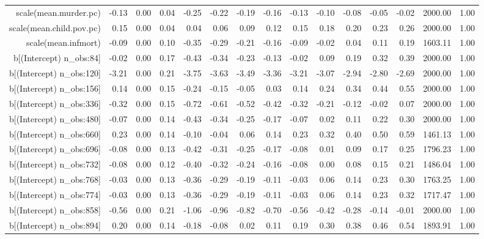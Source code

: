 \begin{table}[ht]
\begin{tabular}{rrrrrrrrrrrrrrr}
  scale(mean.murder.pc) & -0.13 & 0.00 & 0.04 & -0.25 & -0.22 & -0.19 & -0.16 & -0.13 & -0.10 & -0.08 & -0.05 & -0.02 & 2000.00 & 1.00 \\ 
  scale(mean.child.pov.pc) & 0.15 & 0.00 & 0.04 & 0.04 & 0.06 & 0.09 & 0.12 & 0.15 & 0.18 & 0.20 & 0.23 & 0.26 & 2000.00 & 1.00 \\ 
  scale(mean.infmort) & -0.09 & 0.00 & 0.10 & -0.35 & -0.29 & -0.21 & -0.16 & -0.09 & -0.02 & 0.04 & 0.11 & 0.19 & 1603.11 & 1.00 \\ 
  b[(Intercept) n\_obs:84] & -0.02 & 0.00 & 0.17 & -0.43 & -0.34 & -0.23 & -0.13 & -0.02 & 0.09 & 0.19 & 0.32 & 0.39 & 2000.00 & 1.00 \\ 
  b[(Intercept) n\_obs:120] & -3.21 & 0.00 & 0.21 & -3.75 & -3.63 & -3.49 & -3.36 & -3.21 & -3.07 & -2.94 & -2.80 & -2.69 & 2000.00 & 1.00 \\ 
  b[(Intercept) n\_obs:156] & 0.14 & 0.00 & 0.15 & -0.24 & -0.15 & -0.05 & 0.03 & 0.14 & 0.24 & 0.34 & 0.44 & 0.55 & 2000.00 & 1.00 \\ 
  b[(Intercept) n\_obs:336] & -0.32 & 0.00 & 0.15 & -0.72 & -0.61 & -0.52 & -0.42 & -0.32 & -0.21 & -0.12 & -0.02 & 0.07 & 2000.00 & 1.00 \\ 
  b[(Intercept) n\_obs:480] & -0.07 & 0.00 & 0.14 & -0.43 & -0.34 & -0.25 & -0.17 & -0.07 & 0.02 & 0.11 & 0.22 & 0.30 & 2000.00 & 1.00 \\ 
  b[(Intercept) n\_obs:660] & 0.23 & 0.00 & 0.14 & -0.10 & -0.04 & 0.06 & 0.14 & 0.23 & 0.32 & 0.40 & 0.50 & 0.59 & 1461.13 & 1.00 \\ 
  b[(Intercept) n\_obs:696] & -0.08 & 0.00 & 0.13 & -0.42 & -0.31 & -0.25 & -0.17 & -0.08 & 0.01 & 0.09 & 0.17 & 0.25 & 1796.23 & 1.00 \\ 
  b[(Intercept) n\_obs:732] & -0.08 & 0.00 & 0.12 & -0.40 & -0.32 & -0.24 & -0.16 & -0.08 & 0.00 & 0.08 & 0.15 & 0.21 & 1486.04 & 1.00 \\ 
  b[(Intercept) n\_obs:768] & -0.03 & 0.00 & 0.13 & -0.36 & -0.29 & -0.19 & -0.11 & -0.03 & 0.06 & 0.14 & 0.23 & 0.30 & 1763.25 & 1.00 \\ 
  b[(Intercept) n\_obs:774] & -0.03 & 0.00 & 0.13 & -0.36 & -0.29 & -0.19 & -0.11 & -0.03 & 0.06 & 0.14 & 0.23 & 0.32 & 1717.47 & 1.00 \\ 
  b[(Intercept) n\_obs:858] & -0.56 & 0.00 & 0.21 & -1.06 & -0.96 & -0.82 & -0.70 & -0.56 & -0.42 & -0.28 & -0.14 & -0.01 & 2000.00 & 1.00 \\ 
  b[(Intercept) n\_obs:894] & 0.20 & 0.00 & 0.14 & -0.18 & -0.08 & 0.02 & 0.11 & 0.19 & 0.30 & 0.38 & 0.46 & 0.54 & 1893.91 & 1.00 \\ 

\end{tabular}
\end{table}
